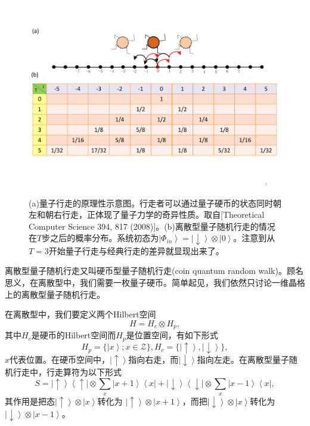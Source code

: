  \begin{figure}[htbp]
            \begin{center}
              \includegraphics[width= 0.8\columnwidth]{figures/qrw.pdf}
              \caption{(a)量子行走的原理性示意图。行走者可以通过量子硬币的状态同时朝左和朝右行走，正体现了量子力学的奇异性质。取自[Theoretical Computer Science 394, 817 (2008)]\cite{crw2}。(b)离散型量子随机行走的情况在$T$步之后的概率分布。系统初态为$\left\vert \Phi_{in} \right \rangle = \left\vert \downarrow \right \rangle \otimes \left\vert 0 \right \rangle$。注意到从$T=3$开始量子行走与经典行走的差异就显现出来了。
              }
              \label{qrw}
            \end{center}
 \end{figure}

 离散型量子随机行走又叫硬币型量子随机行走(coin quantum random walk)。顾名思义，在离散型中，我们需要一枚量子硬币。简单起见，我们依然只讨论一维晶格上的离散型量子随机行走。

 在离散型中，我们要定义两个Hilbert空间
\begin{equation}
          H = H_c\otimes H_p,
\end{equation}
 其中$H_c$是硬币的Hilbert空间而$H_p$是位置空间，有如下形式
\begin{equation}
          H_p = \{\left\vert x \right \rangle; x\in \mathcal{Z} \}, H_c = \{\left\vert \uparrow \right \rangle, \left\vert \downarrow \right \rangle\},
\end{equation}
$x$代表位置。在硬币空间中，$\left\vert \uparrow \right \rangle$指向右走，而$\left\vert \downarrow \right \rangle$指向左走。在离散型量子随机行走中，行走算符为以下形式
 \begin{equation}
          S =\left\vert \uparrow \right \rangle \left\langle \uparrow \right \vert \otimes \sum_x \left\vert x+1 \right \rangle  \left\langle x \right \vert +\left\vert \downarrow \right \rangle \left\langle \downarrow \right \vert \otimes \sum_x \left\vert x-1 \right \rangle  \left\langle x \right \vert,
\end{equation}
其作用是把态$\left\vert\uparrow \right \rangle \otimes  \left\vert x \right \rangle $转化为 $\left\vert \uparrow \right \rangle \otimes  \left\vert x+1 \right \rangle $，而把$\left\vert \downarrow \right \rangle \otimes  \left\vert x \right \rangle $转化为$\left\vert \downarrow \right \rangle \otimes  \left\vert x-1 \right \rangle $。

